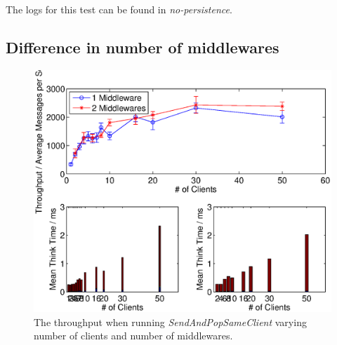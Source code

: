 \documentclass{article}
\begin{document}
        The logs for this test can be found in \textit{no-persistence}.
            
        \subsection{Difference in number of middlewares}
        \label{sec:diff_middleware}
            \begin{figure}[H]
                \centerline{\includegraphics[scale=0.60]{throughout_middleware_clients}}
                \caption{The throughput when running \textit{SendAndPopSameClient} varying number of clients and number of middlewares.}
                \label{fig:throughput_middleware_clients}
            \end{figure}
            
\end{document}
